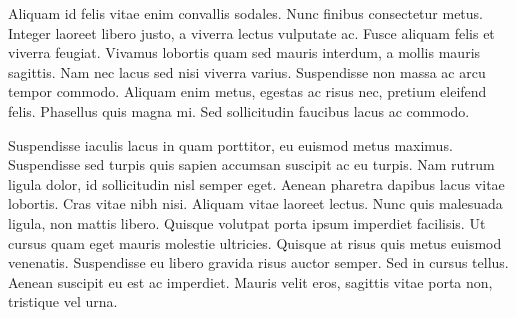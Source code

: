 \documentclass[]{article}
\begin{document}
Aliquam id felis vitae enim convallis sodales. Nunc finibus consectetur
metus. Integer laoreet libero justo, a viverra lectus vulputate ac.
Fusce aliquam felis et viverra feugiat. Vivamus lobortis quam sed mauris
interdum, a mollis mauris sagittis. Nam nec lacus sed nisi viverra
varius. Suspendisse non massa ac arcu tempor commodo. Aliquam enim
metus, egestas ac risus nec, pretium eleifend felis. Phasellus quis
magna mi. Sed sollicitudin faucibus lacus ac commodo.

Suspendisse iaculis lacus in quam porttitor, eu euismod metus maximus.
Suspendisse sed turpis quis sapien accumsan suscipit ac eu turpis. Nam
rutrum ligula dolor, id sollicitudin nisl semper eget. Aenean pharetra
dapibus lacus vitae lobortis. Cras vitae nibh nisi. Aliquam vitae
laoreet lectus. Nunc quis malesuada ligula, non mattis libero. Quisque
volutpat porta ipsum imperdiet facilisis. Ut cursus quam eget mauris
molestie ultricies. Quisque at risus quis metus euismod venenatis.
Suspendisse eu libero gravida risus auctor semper. Sed in cursus tellus.
Aenean suscipit eu est ac imperdiet. Mauris velit eros, sagittis vitae
porta non, tristique vel urna.
\end{document}
